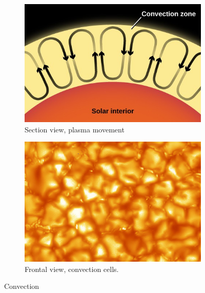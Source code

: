 \begin{figure}[t]
    \centering
    \begin{subfigure}[b]{0.49\textwidth}
        \includegraphics[width=\textwidth]{./pictures/convection}
        \caption{Section view, plasma movement}
        \label{fig:convect}
    \end{subfigure}
    \begin{subfigure}[b]{0.49\textwidth}
        \includegraphics[width=\textwidth]{./pictures/convection-cell}
        \caption{Frontal view, convection cells.}
        \label{fig:convect-cells}
    \end{subfigure}
    \caption{Convection}\label{fig:systemview}
\end{figure}

